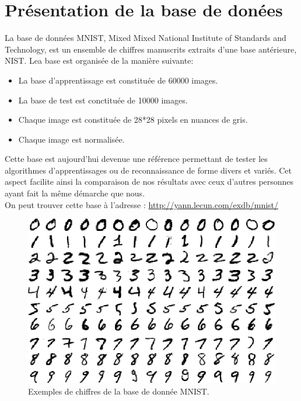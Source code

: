 \documentclass[a4paper,oneside]{report}
\begin{document}
            \section{Présentation de la base de donées}

                La base de données MNIST, Mixed Mixed National Institute of Standards and Technology, 
est un ensemble de chiffres manuscrits extraits d'une base antérieure, NIST. Lea base 
est organisée de la manière 
suivante:

                \begin{itemize}
                    \item La base d'apprentissage est constituée de 60000 images.
                    \item La base de test est conctituée de 10000 images.
                    \item Chaque image est constituée de 28*28 pixels en nuances de gris.
                    \item Chaque image est normalisée.\\
                \end{itemize}

                Cette base est aujourd'hui devenue une référence permettant de tester les algorithmes 
d'apprentissages ou de reconnaissance de forme divers et variés. Cet aspect facilite 
ainsi la comparaison de nos 
résultats avec ceux d'autres personnes ayant fait la même démarche que nous.\\

                On peut trouver cette base à l'adresse : \url{http://yann.lecun.com/exdb/mnist/}

                \begin{figure}
                    \begin{center}
                        \includegraphics{Images/mnist-01.png}
                    \end{center}
                    \caption{Exemples de chiffres de la base de donnée MNIST.}
                \end{figure}
\end{document}
